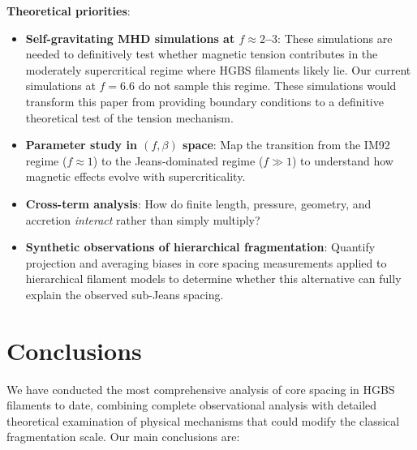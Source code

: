\documentclass[11pt,a4paper]{article}
\begin{document}
\textbf{Theoretical priorities}:
\begin{itemize}
    \item \textbf{Self-gravitating MHD simulations at $f \approx 2$--$3$}: These simulations are needed to definitively test whether magnetic tension contributes in the moderately supercritical regime where HGBS filaments likely lie. Our current simulations at $f = 6.6$ do not sample this regime. These simulations would transform this paper from providing boundary conditions to a definitive theoretical test of the tension mechanism.
    \item \textbf{Parameter study in $(f, \beta)$ space}: Map the transition from the IM92 regime ($f \approx 1$) to the Jeans-dominated regime ($f \gg 1$) to understand how magnetic effects evolve with supercriticality.
    \item \textbf{Cross-term analysis}: How do finite length, pressure, geometry, and accretion \textit{interact} rather than simply multiply?
    \item \textbf{Synthetic observations of hierarchical fragmentation}: Quantify projection and averaging biases in core spacing measurements applied to hierarchical filament models to determine whether this alternative can fully explain the observed sub-Jeans spacing.
\end{itemize}

\section{Conclusions}
\label{sec:conclusions}

We have conducted the most comprehensive analysis of core spacing in HGBS filaments to date, combining complete observational analysis with detailed theoretical examination of physical mechanisms that could modify the classical fragmentation scale. Our main conclusions are:
\end{document}
